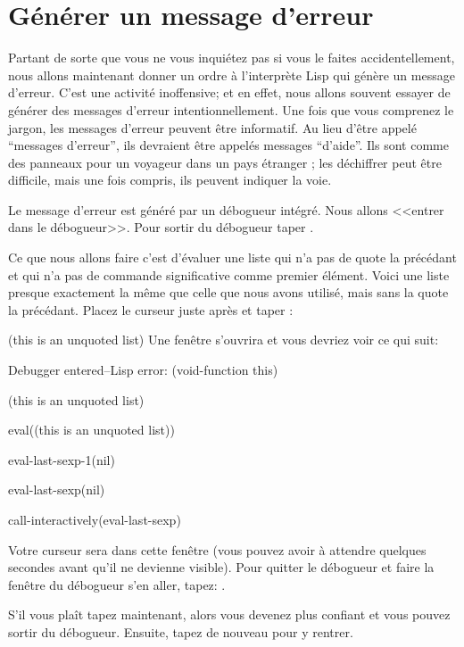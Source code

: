 \section{Générer un message d'erreur}

Partant de sorte que vous ne vous inquiétez pas si vous le faites
accidentellement, nous allons maintenant donner un ordre à
l'interprète Lisp qui génère un message d'erreur. C'est une activité
inoffensive; et en effet, nous allons souvent essayer de générer des
messages d'erreur intentionnellement. Une fois que vous comprenez le
jargon, les messages d'erreur peuvent être informatif. Au lieu d'être
appelé ``messages d'erreur'', ils devraient être appelés messages
``d'aide''. Ils sont comme des panneaux pour un voyageur dans un pays
étranger ; les déchiffrer peut être difficile, mais une fois compris,
ils peuvent indiquer la voie. 

Le message d'erreur est généré par un débogueur \gem intégré. Nous
allons <<entrer dans le débogueur>>. Pour sortir du débogueur taper
.

Ce que nous allons faire c'est d'évaluer une liste qui n'a pas de
quote la précédant et qui n'a pas de commande significative comme
premier élément. Voici une liste presque exactement la même que celle
que nous avons utilisé, mais sans la quote la précédant. Placez le
curseur juste après et taper :
\begin{center}
\end{center}

(this is an unquoted list)
Une fenêtre  s'ouvrira et vous devriez voir ce qui suit:
{\ttfamily
\begin{flushleft}
  Debugger entered--Lisp error: (void-function this)
  
  (this is an unquoted list)

  eval((this is an unquoted list))

  eval-last-sexp-1(nil)

  eval-last-sexp(nil)

  call-interactively(eval-last-sexp)
\end{flushleft}}

Votre curseur sera dans cette fenêtre (vous pouvez avoir à attendre
quelques secondes avant qu'il ne devienne visible). Pour quitter le
débogueur et faire la fenêtre du débogueur s'en aller, tapez: .

S'il vous plaît tapez  maintenant, alors vous devenez plus
confiant et vous pouvez sortir du débogueur. Ensuite, tapez
 de nouveau pour y rentrer.

